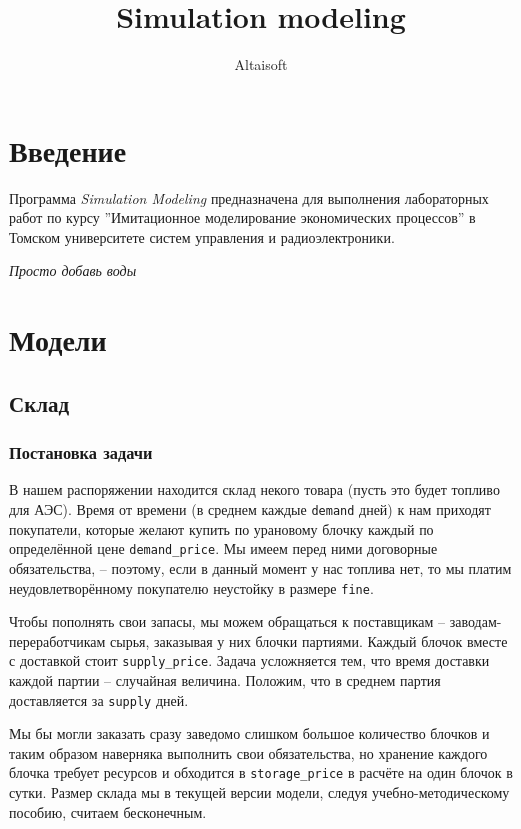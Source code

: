 \documentclass[12pt,final]{article}
\def\SM{\emph{Simulation Modeling} }
\begin{document}
\author{Altaisoft}
\title{Simulation modeling}

\maketitle

\section{Введение}

Программа \SM предназначена для выполнения лабораторных работ по курсу ''Имитационное моделирование экономических процессов'' в Томском университете систем управления и радиоэлектроники.

\emph{Просто добавь воды}

\section{Модели}

\subsection{Склад}

\subsubsection{Постановка задачи}
В нашем распоряжении находится склад некого товара (пусть это будет топливо для АЭС). Время от времени (в среднем каждые \texttt{demand} дней) к нам приходят покупатели, которые желают купить по урановому блочку каждый по определённой цене \texttt{demand\_price}. Мы имеем перед ними договорные обязательства, -- поэтому, если в данный момент у нас топлива нет, то мы платим неудовлетворённому покупателю неустойку в размере \texttt{fine}.

Чтобы пополнять свои запасы, мы можем обращаться к поставщикам -- заводам-переработчикам сырья, заказывая у них блочки партиями. Каждый блочок вместе с доставкой стоит \texttt{supply\_price}. Задача усложняется тем, что время доставки каждой партии -- случайная величина. Положим, что в среднем партия доставляется за \texttt{supply} дней.

Мы бы могли заказать сразу заведомо слишком большое количество блочков и таким образом наверняка выполнить свои обязательства, но хранение каждого блочка требует ресурсов и обходится в \texttt{storage\_price} в расчёте на один блочок в сутки. Размер склада мы в текущей версии модели, следуя учебно-методическому пособию, считаем бесконечным.
\end{document}
